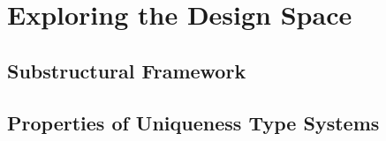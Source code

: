 \chapter{Exploring the Design Space}\label{sec:designspace}

\section{Substructural Framework}

\section{Properties of Uniqueness Type Systems}